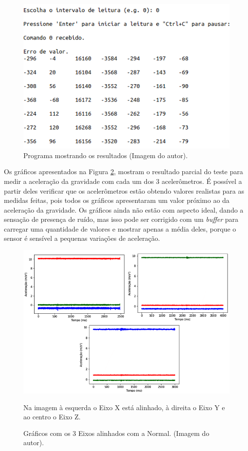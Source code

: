 	\begin{figure}[h!]
		\centering
		\includegraphics[keepaspectratio=true,scale=0.5]{figuras/programa_rodando.png}
		\caption{Programa mostrando os resultados (Imagem do autor).}
	
		\label{rodando}	
	\end{figure}
	
		
	Os gráficos apresentados na Figura \ref{acelx_0}, mostram o resultado parcial do teste para medir a aceleração da gravidade com cada um dos 3 acelerômetros. É possível a partir deles verificar que os acelerômetros estão obtendo valores realistas para as medidas feitas, pois todos os gráficos apresentaram um valor próximo ao da aceleração da gravidade. Os gráficos ainda não estão com aspecto ideal, dando a sensação de presença de ruído, mas isso pode ser corrigido com um \textit{buffer} para carregar uma quantidade de valores e mostrar apenas a média deles, porque o sensor é sensível a pequenas variações de aceleração.   
	
	\begin{figure}[h!]
		\centering
		\includegraphics[keepaspectratio=true,scale=0.6]{figuras/graficos_acel.png}
		\caption{Gráficos com os 3 Eixos alinhados com a Normal. (Imagem do autor).}
		Na imagem à esquerda o Eixo X está alinhado, à direita o Eixo Y e ao centro o Eixo Z. \footnotesize 
		\label{acelx_0}	
	\end{figure}		
	
